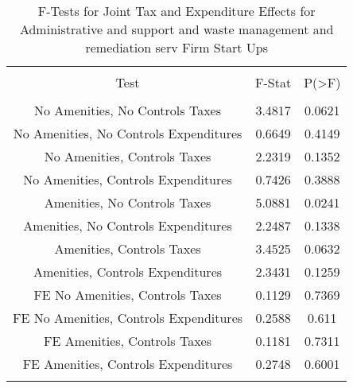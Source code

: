 
\begin{table}[!htbp] \centering 
  \caption{F-Tests for Joint Tax and Expenditure Effects for Administrative and support and waste management and remediation serv Firm Start Ups} 
  \label{56Ftests} 
\begin{tabular}{@{\extracolsep{5pt}} ccc} 
\\[-1.8ex]\hline 
\hline \\[-1.8ex] 
Test & F-Stat & P(\textgreater F) \\ 
\hline \\[-1.8ex] 
No Amenities, No Controls Taxes & 3.4817 & 0.0621 \\ 
No Amenities, No Controls Expenditures & 0.6649 & 0.4149 \\ 
No Amenities, Controls Taxes & 2.2319 & 0.1352 \\ 
No Amenities, Controls Expenditures & 0.7426 & 0.3888 \\ 
Amenities, No Controls Taxes & 5.0881 & 0.0241 \\ 
Amenities, No Controls Expenditures & 2.2487 & 0.1338 \\ 
Amenities, Controls Taxes & 3.4525 & 0.0632 \\ 
Amenities, Controls Expenditures & 2.3431 & 0.1259 \\ 
FE No Amenities, Controls Taxes & 0.1129 & 0.7369 \\ 
FE No Amenities, Controls Expenditures & 0.2588 & 0.611 \\ 
FE Amenities, Controls Taxes & 0.1181 & 0.7311 \\ 
FE Amenities, Controls Expenditures & 0.2748 & 0.6001 \\ 
\hline \\[-1.8ex] 
\end{tabular} 
\end{table} 

